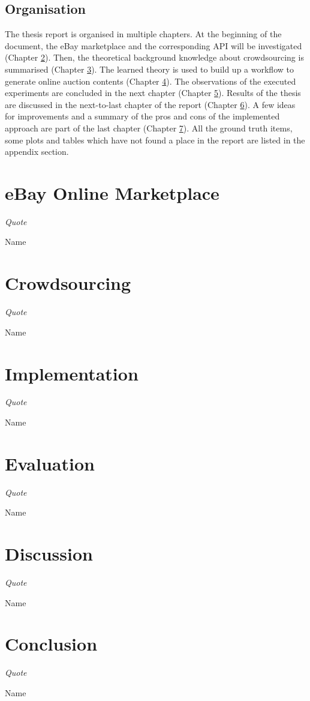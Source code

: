 \documentclass[a4paper]{report}
\begin{document}
\section{Organisation}
The thesis report is organised in multiple chapters. At the beginning of the document, the eBay marketplace and the corresponding API will be investigated (Chapter \ref{chap:ebay}). Then, the theoretical background knowledge about crowdsourcing is summarised (Chapter \ref{chap:crowdsourcing}). The learned theory is used to build up a workflow to generate online auction contents (Chapter \ref{chap:implementation}). The observations of the executed experiments are concluded in the next chapter (Chapter \ref{chap:evaluation}). Results of the thesis are discussed in the next-to-last chapter of the report (Chapter \ref{chap:discussion}). A few ideas for improvements and a summary of the pros and cons of the implemented approach are part of the last chapter (Chapter \ref{chap:conclusion}). All the ground truth items, some plots and tables which have not found a place in the report are listed in the appendix section.

\chapter{eBay Online Marketplace}
\label{chap:ebay}
\epigraph{\textit{Quote}}{Name}


\chapter{Crowdsourcing}
\label{chap:crowdsourcing}
\epigraph{\textit{Quote}}{Name}


\chapter{Implementation}
\label{chap:implementation}
\epigraph{\textit{Quote}}{Name}


\chapter{Evaluation}
\label{chap:evaluation}
\epigraph{\textit{Quote}}{Name}


\chapter{Discussion}
\label{chap:discussion}
\epigraph{\textit{Quote}}{Name}


\chapter{Conclusion}
\label{chap:conclusion}
\epigraph{\textit{Quote}}{Name}


\clearpage



\newpage
\clearpage
\begin{appendices}

\end{appendices}

%
\end{document}
